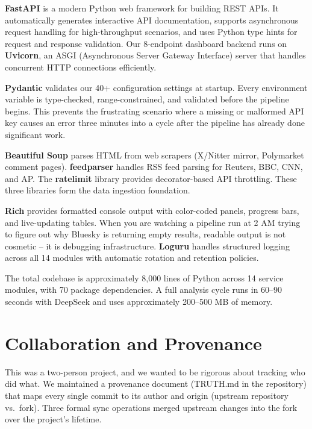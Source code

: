 \documentclass[conference]{IEEEtran}
\begin{document}
\textbf{FastAPI} is a modern Python web framework for building REST APIs. It automatically generates interactive API documentation, supports asynchronous request handling for high-throughput scenarios, and uses Python type hints for request and response validation. Our 8-endpoint dashboard backend runs on \textbf{Uvicorn}, an ASGI (Asynchronous Server Gateway Interface) server that handles concurrent HTTP connections efficiently.

\textbf{Pydantic} validates our 40+ configuration settings at startup. Every environment variable is type-checked, range-constrained, and validated before the pipeline begins. This prevents the frustrating scenario where a missing or malformed API key causes an error three minutes into a cycle after the pipeline has already done significant work.

\textbf{Beautiful Soup} parses HTML from web scrapers (X/Nitter mirror, Polymarket comment pages). \textbf{feedparser} handles RSS feed parsing for Reuters, BBC, CNN, and AP. The \textbf{ratelimit} library provides decorator-based API throttling. These three libraries form the data ingestion foundation.

\textbf{Rich} provides formatted console output with color-coded panels, progress bars, and live-updating tables. When you are watching a pipeline run at 2 AM trying to figure out why Bluesky is returning empty results, readable output is not cosmetic -- it is debugging infrastructure. \textbf{Loguru} handles structured logging across all 14 modules with automatic rotation and retention policies.

The total codebase is approximately 8,000 lines of Python across 14 service modules, with 70 package dependencies. A full analysis cycle runs in 60--90 seconds with DeepSeek and uses approximately 200--500 MB of memory.

\section{Collaboration and Provenance}

This was a two-person project, and we wanted to be rigorous about tracking who did what. We maintained a provenance document (TRUTH.md in the repository) that maps every single commit to its author and origin (upstream repository vs.\ fork). Three formal sync operations merged upstream changes into the fork over the project's lifetime.
\end{document}
